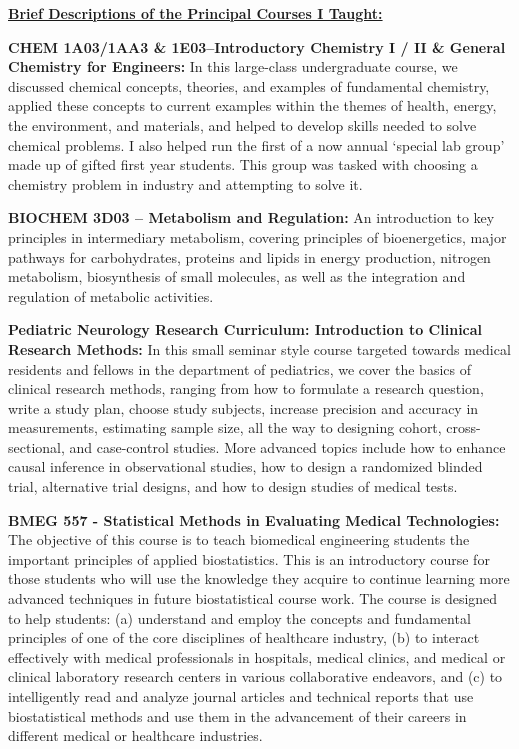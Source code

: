 \documentclass[11pt,notitlepage,english]{report}
\begin{document}
\vspace{10pt}
\textbf{\underline{Brief Descriptions of the Principal Courses I Taught: }}

\vspace{5pt}

\textbf{CHEM 1A03/1AA3 \& 1E03–Introductory Chemistry I / II \& General Chemistry for Engineers:} In this large-class undergraduate course, we discussed chemical concepts, theories, and examples of fundamental chemistry, applied these concepts to current examples within the themes of health, energy, the environment, and materials, and helped to develop skills needed to solve chemical problems. I also helped run the first of a now annual ‘special lab group’ made up of gifted first year students. This group was tasked with choosing a chemistry problem in industry and attempting to solve it.

\vspace{5pt}

\textbf{BIOCHEM 3D03 – Metabolism and Regulation:} An introduction to key principles in intermediary metabolism, covering principles of bioenergetics, major pathways for carbohydrates, proteins and lipids in energy production, nitrogen metabolism, biosynthesis of small molecules, as well as the integration and regulation of metabolic activities.

\vspace{5pt}

\textbf{Pediatric Neurology Research Curriculum: Introduction to Clinical Research Methods:} In this small seminar style course targeted towards medical residents and fellows in the department of pediatrics, we cover the basics of clinical research methods, ranging from how to formulate a research question, write a study plan, choose study subjects, increase precision and accuracy in measurements, estimating sample size, all the way to designing cohort, cross-sectional, and case-control studies. More advanced topics include how to enhance causal inference in observational studies, how to design a randomized blinded trial, alternative trial designs, and how to design studies of medical tests.

\vspace{5pt}

\textbf{BMEG 557 - Statistical Methods in Evaluating Medical Technologies:} The objective of this course is to teach biomedical engineering students the important principles of applied biostatistics. This is an introductory course for those students who will use the knowledge they acquire to continue learning more advanced techniques in future biostatistical course work. The course is designed to help students: (a) understand and employ the concepts and fundamental principles of one of the core disciplines of healthcare industry, (b) to interact effectively with medical professionals in hospitals, medical clinics, and medical or clinical laboratory research centers in various collaborative endeavors, and (c) to intelligently read and analyze journal articles and technical reports that use biostatistical methods and use them in the advancement of their careers in different medical or healthcare industries.
\end{document}

